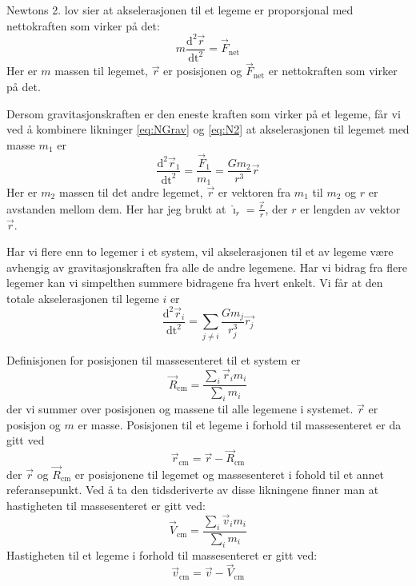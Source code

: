 \documentclass[reprint, english,notitlepage]{revtex4-1}  %
\begin{document}
Newtons 2. lov sier at akselerasjonen til et legeme er proporsjonal med nettokraften som virker
 på det:
 \begin{equation}
   \label{eq:N2}
   m \frac{\mathrm{d}^2 \vec{r}}{\mathrm{dt}^2} = \vec{F}_{\text{net}}
 \end{equation}
 Her er $m$ massen til legemet, $\vec{r}$ er posisjonen og $\vec{F}_{\text{net}}$ er nettokraften som virker på det.

Dersom gravitasjonskraften er den eneste kraften som virker på et legeme, får vi ved å kombinere
 likninger \ref{eq:NGrav} og \ref{eq:N2} at akselerasjonen til legemet med masse $m_1$ er
 \begin{equation}
   \label{eq:acc_planet}
   \frac{\mathrm{d}^2 \vec{r}_1}{\mathrm{dt}^2} = \frac{\vec{F}_1}{m_1} = \frac{G m_2}{r^3} \vec{r}
 \end{equation}
 Her er $m_2$ massen til det andre legemet, $\vec{r}$ er vektoren fra $m_1$ til $m_2$ og $r$ er avstanden mellom dem. Her har jeg brukt at $\hat{\imath}_r = \frac{\vec{r}}{r}$, der $r$ er lengden av vektor $\vec{r}$.

Har vi flere enn to legemer i et system, vil akselerasjonen til et av legeme være avhengig av
 gravitasjonskraften fra alle de andre legemene. Har vi bidrag fra flere legemer kan vi simpelthen summere bidragene fra hvert enkelt. Vi får at den totale akselerasjonen til legeme $i$ er
 \begin{equation}
   \label{eq:acc_star}
   \frac{\mathrm{d}^2 \vec{r}_i}{\mathrm{dt}^2} = \sum_{j \neq i} \frac{G m_j}{r_j^3} \vec{r_j}
 \end{equation}

Definisjonen for posisjonen til massesenteret til et system er \[\vec{R}_{\text{cm}} = \frac{\sum_i \vec{r}_i m_i}{\sum_i m_i} \] der vi summer over posisjonen og massene til alle legemene i systemet. $\vec{r}$ er posisjon og $m$ er masse. Posisjonen til et legeme i forhold til massesenteret er da gitt ved \[\vec{r}_{\text{cm}} = \vec{r} - \vec{R}_{\text{cm}}\] der $\vec{r}$ og $\vec{R}_{\text{cm}}$ er posisjonene til legemet og massesenteret i fohold til et annet referansepunkt. Ved å ta den tidsderiverte av disse likningene finner man at hastigheten til massesenteret er gitt ved: \[\vec{V}_{\text{cm}} = \frac{\sum_i \vec{v}_i m_i}{\sum_i m_i} \] Hastigheten til et legeme i forhold til massesenteret er gitt ved:
  \begin{equation}
    \label{eq:v_cm}
    \vec{v}_{\text{cm}} = \vec{v} - \vec{V}_{\text{cm}}
  \end{equation}
\end{document}
